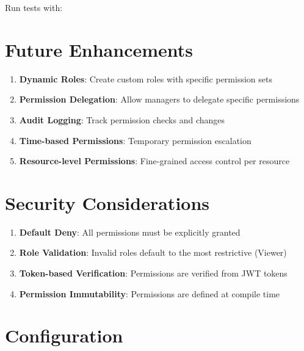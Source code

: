 Run tests with:

\begin{Shaded}
\begin{Highlighting}[]
\end{Highlighting}
\end{Shaded}

\section{Future Enhancements}\label{future-enhancements}

\begin{enumerate}
\def\labelenumi{\arabic{enumi}.}
\tightlist
\item
  \textbf{Dynamic Roles}: Create custom roles with specific permission
  sets
\item
  \textbf{Permission Delegation}: Allow managers to delegate specific
  permissions
\item
  \textbf{Audit Logging}: Track permission checks and changes
\item
  \textbf{Time-based Permissions}: Temporary permission escalation
\item
  \textbf{Resource-level Permissions}: Fine-grained access control per
  resource
\end{enumerate}

\section{Security Considerations}\label{security-considerations}

\begin{enumerate}
\def\labelenumi{\arabic{enumi}.}
\tightlist
\item
  \textbf{Default Deny}: All permissions must be explicitly granted
\item
  \textbf{Role Validation}: Invalid roles default to the most
  restrictive (Viewer)
\item
  \textbf{Token-based Verification}: Permissions are verified from JWT
  tokens
\item
  \textbf{Permission Immutability}: Permissions are defined at compile
  time
\end{enumerate}

\section{Configuration}\label{configuration}

